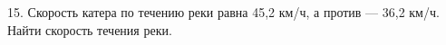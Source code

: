 15. Скорость катера по течению реки равна 45,2 км/ч, а против --- 36,2 км/ч. Найти скорость течения реки.\\
